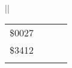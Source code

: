 \documentclass[letterpaper,10pt,english]{sphinxmanual}
\begin{document}
\begin{savenotes}
\begin{tabular}[t]{|*{1}{|}}
\begin{savenotes}
\begin{tabulary}{\linewidth}[t]{|T|T|T|T|}
\sphinxAtStartPar
\$0027
&
&&\\
\sphinxAtStartPar
\$3412
&
&&\\
\sphinxbottomrule
\end{tabulary}
\sphinxtableafterendhook\par
\sphinxattableend\end{savenotes}
\\
\sphinxbottomrule
\end{tabular}
\sphinxtableafterendhook\par
\sphinxattableend\end{savenotes}
\end{document}
